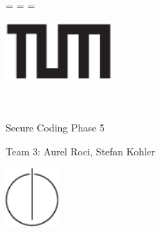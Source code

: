 \begin{titlepage}
  \oddsidemargin=\evensidemargin\relax
  \textwidth=\dimexpr{}\evensidemargin-2in\relax
  \hsize=\textwidth\relax

  \centering

  \includegraphics[width=40mm]{logos/tum}

  \vspace{5mm}
  {\huge\MakeUppercase{\getFaculty{}}}\\

  \vspace{5mm}
  {\large\MakeUppercase{\getUniversity{}}}\\

  \vspace{20mm}
  {\Large Secure Coding Phase 5}

  \vspace{15mm}

  \vspace{15mm}
  {\LARGE Team 3:
  	  Aurel Roci, Stefan Kohler}

  \vspace{20mm}
  \includegraphics[width=20mm]{logos/faculty}
\end{titlepage}

